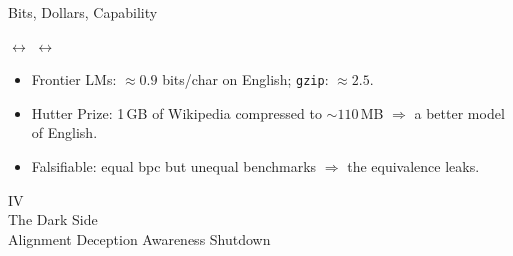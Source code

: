 \documentclass[aspectratio=169, 12pt, xcolor={dvipsnames,table}]{beamer}
\begin{document}
\begin{frame}{Bits, Dollars, Capability}
  \begin{center}
  \hspace{0.4em}\textcolor{anthblue}{\large$\leftrightarrow$}\hspace{0.4em}%
  \hspace{0.4em}\textcolor{anthblue}{\large$\leftrightarrow$}\hspace{0.4em}%
  \end{center}
  \vspace{0.6em}
  \begin{itemize}\setlength{\itemsep}{0.15em}
    \item {\small Frontier LMs: $\approx 0.9$ bits/char on English;
          \texttt{gzip}: $\approx 2.5$.}
    \item {\small Hutter Prize: 1\,GB of Wikipedia compressed to
          ${\sim}110$\,MB $\Rightarrow$ a better model of English.}
    \item {\small \alert{Falsifiable}: equal bpc but unequal benchmarks
          $\Rightarrow$ the equivalence leaks.}
  \end{itemize}
\end{frame}



\begin{frame}[standout]
  \Huge IV\\[12pt]
  \Large The Dark Side\\[4pt]
  \normalsize Alignment \;\textbullet\; Deception \;\textbullet\;
  Awareness \;\textbullet\; Shutdown
\end{frame}
\end{document}
